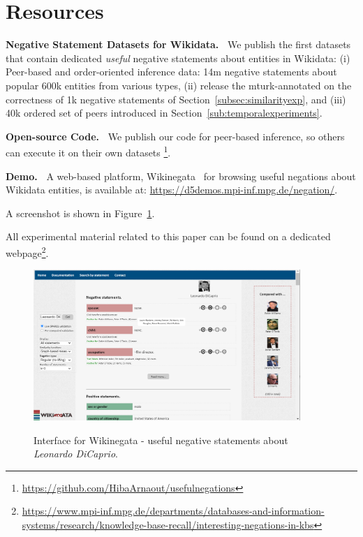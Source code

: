 \section{Resources}
\label{sec:datasets}
\noindent
\textbf{Negative Statement Datasets for Wikidata.\ }
\label{sec:dataset}
We publish the first 
datasets that contain dedicated \emph{useful} negative statements about entities in Wikidata: (i) Peer-based and order-oriented inference data: 14m negative statements about popular 600k entities from various types, (ii) release the mturk-annotated on the correctness of 1k negative statements of Section~\ref{subsec:similarityexp}, and (iii) 40k ordered set of peers introduced in Section~\ref{sub:temporalexperiments}.

\noindent
\textbf{Open-source Code.\ } We publish our code for peer-based inference, so others can execute it on their own datasets \footnote{\url{https://github.com/HibaArnaout/usefulnegations}}.

\noindent
\textbf{Demo.\ }
\label{sec:demo}
A web-based platform, Wikinegata~\cite{ArnaoutRWP21,arnaout2021negative} for browsing useful negations about Wikidata entities, is available at: \url{https://d5demos.mpi-inf.mpg.de/negation/}.

\noindent
A screenshot is shown in Figure~\ref{fig:demo}. 

All experimental material related to this paper can be found on a dedicated webpage\footnote{\url{https://www.mpi-inf.mpg.de/departments/databases-and-information-systems/research/knowledge-base-recall/interesting-negations-in-kbs}}.



\begin{figure}
 \caption{Interface for Wikinegata - useful negative statements about \textit{Leonardo DiCaprio}.}
 \centering
\includegraphics[width=0.9\textwidth]{figures/wikinegata.png}
\label{fig:demo}
\end{figure}

